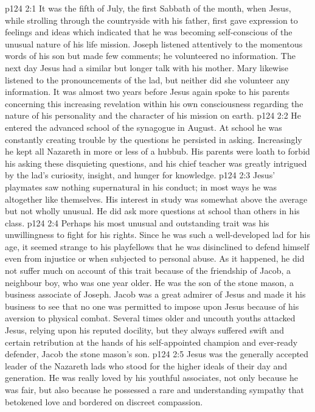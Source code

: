 \vs p124 2:1 It was the fifth of July, the first Sabbath of the month, when Jesus, while strolling through the countryside with his father, first gave expression to feelings and ideas which indicated that he was becoming self\hyp{}conscious of the unusual nature of his life mission. Joseph listened attentively to the momentous words of his son but made few comments; he volunteered no information. The next day Jesus had a similar but longer talk with his mother. Mary likewise listened to the pronouncements of the lad, but neither did she volunteer any information. It was almost two years before Jesus again spoke to his parents concerning this increasing revelation within his own consciousness regarding the nature of his personality and the character of his mission on earth.
\vs p124 2:2 \pc He entered the advanced school of the synagogue in August. At school he was constantly creating trouble by the questions he persisted in asking. Increasingly he kept all Nazareth in more or less of a hubbub. His parents were loath to forbid his asking these disquieting questions, and his chief teacher was greatly intrigued by the lad’s curiosity, insight, and hunger for knowledge.
\vs p124 2:3 Jesus’ playmates saw nothing supernatural in his conduct; in most ways he was altogether like themselves. His interest in study was somewhat above the average but not wholly unusual. He did ask more questions at school than others in his class.
\vs p124 2:4 \pc Perhaps his most unusual and outstanding trait was his unwillingness to fight for his rights. Since he was such a well\hyp{}developed lad for his age, it seemed strange to his playfellows that he was disinclined to defend himself even from injustice or when subjected to personal abuse. As it happened, he did not suffer much on account of this trait because of the friendship of Jacob, a neighbour boy, who was one year older. He was the son of the stone mason, a business associate of Joseph. Jacob was a great admirer of Jesus and made it his business to see that no one was permitted to impose upon Jesus because of his aversion to physical combat. Several times older and uncouth youths attacked Jesus, relying upon his reputed docility, but they always suffered swift and certain retribution at the hands of his self\hyp{}appointed champion and ever\hyp{}ready defender, Jacob the stone mason’s son.
\vs p124 2:5 Jesus was the generally accepted leader of the Nazareth lads who stood for the higher ideals of their day and generation. He was really loved by his youthful associates, not only because he was fair, but also because he possessed a rare and understanding sympathy that betokened love and bordered on discreet compassion.
